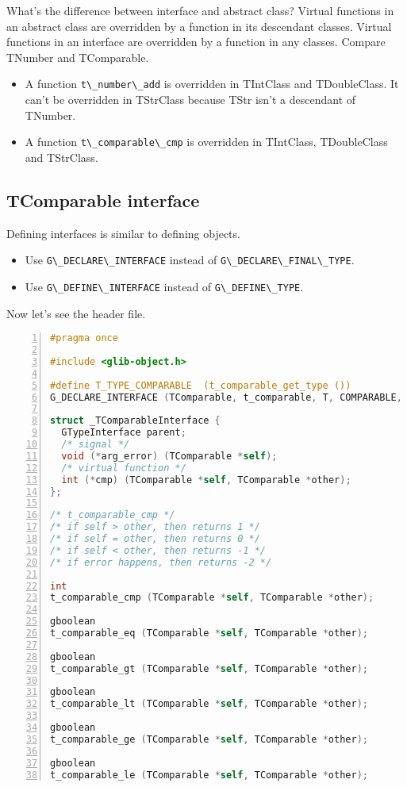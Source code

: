 What's the difference between interface and abstract class? Virtual
functions in an abstract class are overridden by a function in its
descendant classes. Virtual functions in an interface are overridden by
a function in any classes. Compare TNumber and TComparable.

\begin{itemize}
\tightlist
\item
  A function \passthrough{\lstinline!t\_number\_add!} is overridden in
  TIntClass and TDoubleClass. It can't be overridden in TStrClass
  because TStr isn't a descendant of TNumber.
\item
  A function \passthrough{\lstinline!t\_comparable\_cmp!} is overridden
  in TIntClass, TDoubleClass and TStrClass.
\end{itemize}

\subsection{TComparable interface}\label{tcomparable-interface}

Defining interfaces is similar to defining objects.

\begin{itemize}
\tightlist
\item
  Use \passthrough{\lstinline!G\_DECLARE\_INTERFACE!} instead of
  \passthrough{\lstinline!G\_DECLARE\_FINAL\_TYPE!}.
\item
  Use \passthrough{\lstinline!G\_DEFINE\_INTERFACE!} instead of
  \passthrough{\lstinline!G\_DEFINE\_TYPE!}.
\end{itemize}

Now let's see the header file.

\begin{lstlisting}[language=C, numbers=left]
#pragma once

#include <glib-object.h>

#define T_TYPE_COMPARABLE  (t_comparable_get_type ())
G_DECLARE_INTERFACE (TComparable, t_comparable, T, COMPARABLE, GObject)

struct _TComparableInterface {
  GTypeInterface parent;
  /* signal */
  void (*arg_error) (TComparable *self);
  /* virtual function */
  int (*cmp) (TComparable *self, TComparable *other);
};

/* t_comparable_cmp */
/* if self > other, then returns 1 */
/* if self = other, then returns 0 */
/* if self < other, then returns -1 */
/* if error happens, then returns -2 */

int
t_comparable_cmp (TComparable *self, TComparable *other);

gboolean
t_comparable_eq (TComparable *self, TComparable *other);

gboolean
t_comparable_gt (TComparable *self, TComparable *other);

gboolean
t_comparable_lt (TComparable *self, TComparable *other);

gboolean
t_comparable_ge (TComparable *self, TComparable *other);

gboolean
t_comparable_le (TComparable *self, TComparable *other);
\end{lstlisting}

